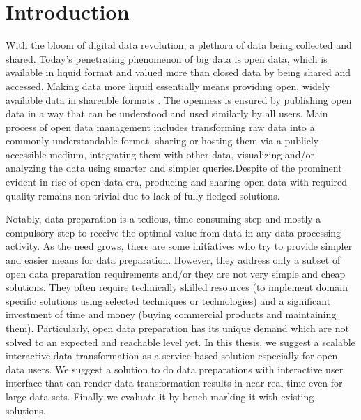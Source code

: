 
\chapter{Introduction} %
\label{Chapter1} %



\noindent With the bloom of digital data revolution, a plethora of data being collected and shared. Today’s penetrating phenomenon of big data is open data, which is available in liquid format and valued more  than closed data by being shared and accessed\citep{opendataunlockinginnovation}. Making data more liquid essentially means providing open, widely available data in shareable formats \cite{opendataunlockinginnovation}. The openness is ensured by publishing open data in a way that can be understood and used similarly by all users\cite{opendatahandbook}. Main process of open data management includes transforming raw data into a commonly understandable format, sharing or hosting them via a publicly accessible medium, integrating them with other data, visualizing and/or analyzing the data using smarter and simpler queries\cite{howlinkeddataistransforminggovernment}.Despite of the prominent evident in rise of open data era, producing and sharing  open data with required quality remains non-trivial\cite{towardsopendatadevelopmentmodelforlinkeddata} due to lack of fully fledged solutions. 

\noindent Notably, data preparation is a tedious, time consuming step and mostly a compulsory step to receive the optimal value from data in any data processing activity\cite{datapreparationfordatamining}. As the need grows, there are some initiatives who try to provide simpler and easier means for data preparation. However, they address only a subset of open data preparation requirements and/or they are not very simple and cheap solutions\cite{ligthweightopendatatransformation}\cite{cleaningprobsandapproaches}\cite{declarativedatacleaning}\cite{visualizationsandtransformationsinwrangling}. They often require technically skilled resources (to implement domain specific solutions using selected techniques or technologies) and a significant investment of time and money (buying commercial products and maintaining them). Particularly, open data preparation has its unique demand which are not solved to an expected and reachable level yet. In this thesis, we suggest a scalable interactive data transformation as a service based solution especially for open data users. We suggest a solution to do data preparations with interactive user interface that can render data transformation results in near-real-time even for large data-sets. Finally we evaluate it by bench marking it with existing solutions.

